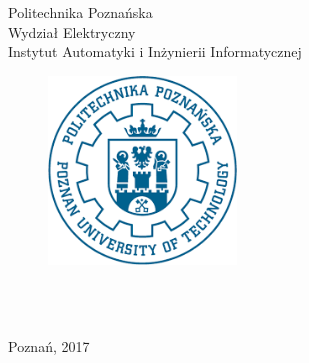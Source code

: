 \thispagestyle{empty}
\begin{center}\LARGE
	Politechnika Poznańska\\
	Wydział Elektryczny\\  
	Instytut Automatyki i Inżynierii Informatycznej\\
	  \vspace{15mm}
	\begin{figure}[ht!]
	  	\centering
	  	\includegraphics[width=50mm]{img/pplogo.png}
	\end{figure}
	  \vspace{15mm}
	\large{\Students}\\
	  \vspace{15mm}
	\LARGE\textbf{\TytulPolski}\\
\end{center}

\begin{center}\vfill
	Poznań, 2017
\end{center}